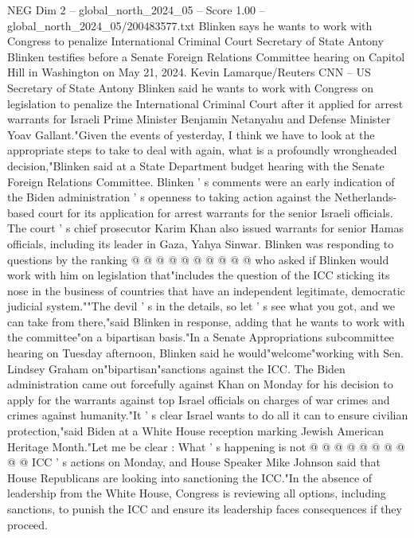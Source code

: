 \begin{textsample}{NEG Dim 2 – global\_north\_2024\_05 – Score 1.00 – global\_north\_2024\_05/200483577.txt}  \label{ex:f2_neg_059}
Blinken says he wants to work with Congress to penalize International Criminal Court Secretary of State Antony Blinken testifies before a Senate Foreign Relations Committee hearing on Capitol Hill in Washington on May 21, 2024.
Kevin Lamarque/Reuters CNN -- US Secretary of State Antony Blinken said he wants to work with Congress on legislation to penalize the International Criminal Court after it applied for arrest warrants for Israeli Prime Minister Benjamin Netanyahu and Defense Minister Yoav Gallant."Given the events of yesterday, I think we have to look at the appropriate steps to take to deal with again, what is a profoundly wrongheaded decision,"Blinken said at a State Department budget hearing with the Senate Foreign Relations Committee.
Blinken ' s comments were an early indication of the Biden administration ' s openness to taking action against the Netherlands-based court for its application for arrest warrants for the senior Israeli officials.
The court ' s chief prosecutor Karim Khan also issued warrants for senior Hamas officials, including its leader in Gaza, Yahya Sinwar.
Blinken was responding to questions by the ranking @ @ @ @ @ @ @ @ @ @ who asked if Blinken would work with him on legislation that"includes the question of the ICC sticking its nose in the business of countries that have an independent legitimate, democratic judicial system.""The devil ' s in the details, so let ' s see what you got, and we can take from there,"said Blinken in response, adding that he wants to work with the committee"on a bipartisan basis."In a Senate Appropriations subcommittee hearing on Tuesday afternoon, Blinken said he would"welcome"working with Sen.
Lindsey Graham on"bipartisan"sanctions against the ICC.
The Biden administration came out forcefully against Khan on Monday for his decision to apply for the warrants against top Israel officials on charges of war crimes and crimes against humanity."It ' s clear Israel wants to do all it can to ensure civilian protection,"said Biden at a White House reception marking Jewish American Heritage Month."Let me be clear : What ' s happening is not @ @ @ @ @ @ @ @ @ @ ICC ' s actions on Monday, and House Speaker Mike Johnson said that House Republicans are looking into sanctioning the ICC."In the absence of leadership from the White House, Congress is reviewing all options, including sanctions, to punish the ICC and ensure its leadership faces consequences if they proceed.

\end{textsample}
